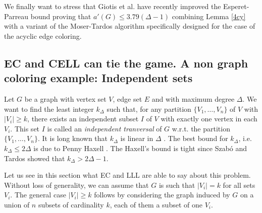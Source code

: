 \documentclass[11pt]{article}
\let\D=\Delta \let\F=\Phi \let\G=\Gamma \let\L=\Lambda \let\Th=\Theta
\let\\=\noindent
\begin{document}
\\We finally want to stress that Giotis et al. \cite{GKPT} have recently improved the Esperet-Parreau bound proving that $a'(G)\le 3.79(\D-1)$
combining Lemma \ref{4cy} with a variant of the Moser-Tardos algorithm specifically designed for the case of the acyclic edge coloring.











\subsection{EC and CELL can tie the game. A non graph coloring example: Independent sets}
\\Let $G$ be a graph with vertex set $V$, edge set $E$ and with maximum degree $\D$.
We want to find the least integer  $k_\D$ such that, for any partition $\{V_1,\dots, V_n\}$ of
$V$ with $|V_i|\geq k$,  there exists an independent subset $I$ of $V$  with
exactly one vertex in each $V_i$. This set $I$ is called  an  {\it independent tranversal} of $G$ w.r.t. the partition $\{V_1,\dots, V_n\}$.
It is long known that $k_\D$ is linear in  $\D$ \cite{Al,Fe}. The best bound for $k_\D$, i.e. $k_\D\le 2\D$ is due
to Penny Haxell \cite{H}. The Haxell's bound is tight  since Szab\'o and Tardos \cite{ST} showed that $k_\D> 2\D-1$.

\\Let us see in this section  what EC and LLL are able to say about this problem.
Without loss of generality, we can assume that $G$ is such that $|V_i| = k$ for all
sets $V_i$. The general case  $|V_i|\geq k$ follows
by considering the graph induced by $G$ on a union of $n$ subsets
of cardinality $k$, each of them a subset of one $V_i$.
\end{document}
